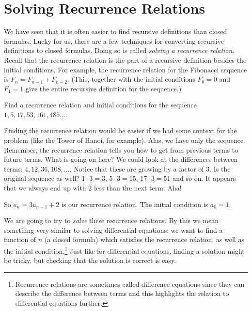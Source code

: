 \documentclass[12pt]{article}
\begin{document}
\section{Solving Recurrence Relations}


We have seen that it is often easier to find recursive definitions than closed formulas.  Lucky for us, there are a few techniques for converting recursive definitions to closed formulas.  Doing so is called \emph{solving a recurrence relation}.  Recall that the recurrence relation is the part of a recursive definition besides the initial conditions.  For example, the recurrence relation for the Fibonacci sequence is $F_n = F_{n-1} + F_{n-2}$.  (This, together with the initial conditions $F_0 = 0$ and $F_1 = 1$ give the entire recursive definition for the sequence.)  
 
\begin{example}
  Find a recurrence relation and initial conditions for the sequence $1, 5, 17, 53, 161, 485\ldots$. 
  \begin{solution}
    Finding the recurrence relation would be easier if we had some context for the problem (like the Tower of Hanoi, for example).  Alas, we have only the sequence.  Remember, the recurrence relation tells you how to get from previous terms to future terms.  What is going on here?  We could look at the differences between terms: $4, 12, 36, 108, \ldots$.  Notice that these are growing by a factor of 3.  Is the original sequence as well?  $1\cdot 3 = 3$, $5 \cdot 3 = 15$, $17 \cdot 3 = 51$ and so on.  It appears that we always end up with 2 less than the next term.  Aha!  
    
    So $a_n = 3a_{n-1} + 2$ is our recurrence relation.  The initial condition is $a_0 = 1$.
  \end{solution}

\end{example}

 
We are going to try to {\em solve} these recurrence relations.  By this we mean something very similar to solving differential equations: we want to find a function of $n$ (a closed formula) which satisfies the recurrence relation, as well as the initial condition.\footnote{Recurrence relations are sometimes called difference equations since they can describe the difference between terms and this highlights the relation to differential equations further.} Just like for differential equations, finding a solution might be tricky, but checking that the solution is correct is easy.
 
\end{document}
